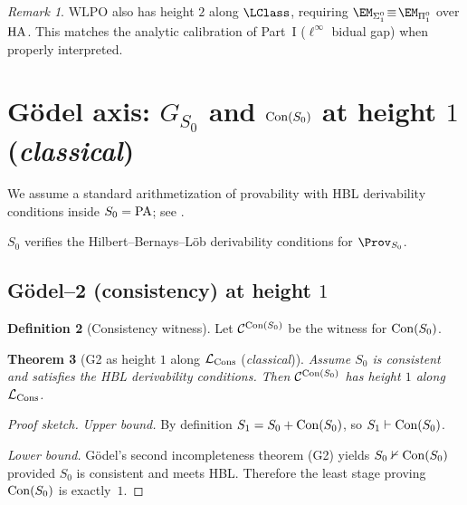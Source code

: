 \documentclass[11pt]{article}
\newtheorem{theorem}{Theorem}[section]
\theoremstyle{definition}
\newtheorem{definition}[theorem]{Definition}
\theoremstyle{remark}
\newtheorem{remark}[theorem]{Remark}
\newcommand{\linf}{\ell^\infty}
\newcommand{\WLPO}{\mathrm{WLPO}}
\begin{document}
\begin{remark}
\(\WLPO\) also has height \(2\) along \(\LClass\), requiring \(\EM_{\Sigma^0_1}\!\equiv\!\EM_{\Pi^0_1}\) over \(\mathrm{HA}\).
This matches the analytic calibration of Part~I (\(\linf\) bidual gap) when properly interpreted.
\end{remark}

\section{G\"odel axis: \(G_{S_0}\) and \(\mathrm{Con}(S_0)\) at height \(1\) (\emph{classical})}

We assume a standard arithmetization of provability with HBL derivability conditions
inside \(S_0=\mathrm{PA}\); see \cite[Ch.~I]{HajekPudlak}.

\begin{assumption}\label{III:ass:HBL-new}
\(S_0\) verifies the Hilbert--Bernays--L\"ob derivability conditions for \(\Prov_{S_0}\).
\end{assumption}

\subsection{G\"odel--2 (consistency) at height \(1\)}

\begin{definition}[Consistency witness]
Let \(\mathcal C^{\mathrm{Con}(S_0)}\) be the witness for \(\mathrm{Con}(S_0)\).
\end{definition}

\begin{theorem}[G2 as height \(1\) along \(\mathcal{L}_{\mathrm{Cons}}\) (\emph{classical})]\label{III:thm:G2-height1-new}
Assume \(S_0\) is consistent and satisfies the HBL derivability conditions.
Then \(\mathcal C^{\mathrm{Con}(S_0)}\) has height \(1\) along \(\mathcal{L}_{\mathrm{Cons}}\).
\end{theorem}

\begin{proof}[Proof sketch]
\emph{Upper bound.} By definition \(S_1=S_0+\mathrm{Con}(S_0)\), so \(S_1\vdash\mathrm{Con}(S_0)\).

\emph{Lower bound.} G\"odel's second incompleteness theorem (G2) yields \(S_0\nvdash\mathrm{Con}(S_0)\) provided
\(S_0\) is consistent and meets HBL. Therefore the least stage proving \(\mathrm{Con}(S_0)\) is exactly~\(1\).
\end{proof}
\end{document}
